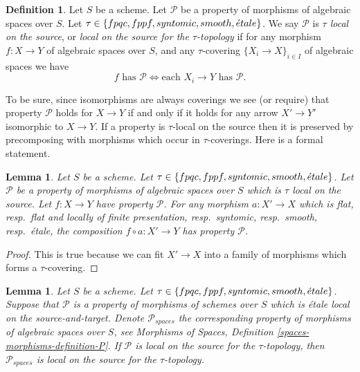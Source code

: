 \documentclass{stacks-project}
\theoremstyle{plain}
\newtheorem{lemma}[subsection]{Lemma}
\theoremstyle{definition}
\newtheorem{definition}[subsection]{Definition}
\theoremstyle{remark}
\numberwithin{equation}{subsection}
\def\etale{{\acute{e}tale}}
\begin{document}
\begin{definition}
\label{definition-property-morphisms-local-source}
Let $S$ be a scheme.
Let $\mathcal{P}$ be a property of morphisms of algebraic spaces over $S$.
Let $\tau \in \{fpqc, \linebreak[0] fppf, \linebreak[0] syntomic, \linebreak[0]
smooth, \linebreak[0] \etale\}$. We say $\mathcal{P}$ is
{\it $\tau$ local on the source}, or
{\it local on the source for the $\tau$-topology} if for
any morphism $f : X \to Y$ of algebraic spaces over $S$, and any
$\tau$-covering $\{X_i \to X\}_{i \in I}$ of algebraic spaces we have
$$
f \text{ has }\mathcal{P}
\Leftrightarrow
\text{each }X_i \to Y\text{ has }\mathcal{P}.
$$
\end{definition}

\noindent
To be sure, since isomorphisms are always coverings
we see (or require) that property $\mathcal{P}$ holds for $X \to Y$
if and only if it holds for any arrow $X' \to Y'$ isomorphic to $X \to Y$.
If a property is $\tau$-local on the source then it is preserved by
precomposing with morphisms which occur in $\tau$-coverings. Here
is a formal statement.

\begin{lemma}
\label{lemma-precompose-property-local-source}
Let $S$ be a scheme.
Let $\tau \in \{fpqc, \linebreak[0] fppf, \linebreak[0] syntomic, \linebreak[0]
smooth, \linebreak[0] \etale\}$.
Let $\mathcal{P}$ be a property of morphisms of algebraic spaces over $S$
which is $\tau$ local on the source. Let $f : X \to Y$ have property
$\mathcal{P}$. For any morphism $a : X' \to X$ which is
flat, resp.\ flat and locally of finite presentation, resp.\ syntomic,
resp.\ smooth, resp.\ \'etale, the composition $f \circ a : X' \to Y$ has
property $\mathcal{P}$.
\end{lemma}

\begin{proof}
This is true because we can fit $X' \to X$ into a family of
morphisms which forms a $\tau$-covering.
\end{proof}

\begin{lemma}
\label{lemma-transfer-from-schemes}
Let $S$ be a scheme.
Let $\tau \in \{fpqc, \linebreak[0] fppf, \linebreak[0] syntomic, \linebreak[0]
smooth, \linebreak[0] \etale\}$.
Suppose that $\mathcal{P}$ is a property of morphisms of schemes over $S$
which is \'etale local on the source-and-target. Denote $\mathcal{P}_{spaces}$
the corresponding property of morphisms of algebraic spaces over $S$, see
Morphisms of Spaces, Definition \ref{spaces-morphisms-definition-P}.
If $\mathcal{P}$ is local on the source for the $\tau$-topology, then
$\mathcal{P}_{spaces}$ is local on the source for the $\tau$-topology.
\end{lemma}
\end{document}
